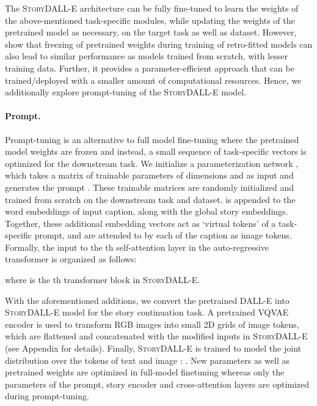\documentclass[runningheads]{llncs}
\newcommand{\sdalle}[1]{\textsc{StoryDALL-E}}
\begin{document}
The \sdalle{} architecture can be fully fine-tuned to learn the weights of the above-mentioned task-specific modules, while updating the weights of the pretrained model as necessary, on the target task as well as dataset. However, \cite{borgeaud2022improving} show that freezing of pretrained weights during training of retro-fitted models can also lead to similar performance as models trained from scratch, with lesser training data. Further, it provides a parameter-efficient approach that can be trained/deployed with a smaller amount of computational resources. Hence, we additionally explore prompt-tuning \cite{li2021prefix} of the \sdalle{} model.


\paragraph{Prompt.} Prompt-tuning is an alternative \cite{li2021prefix} to full model fine-tuning where the pretrained model weights are frozen and instead, a small sequence of task-specific vectors is optimized for the downstream task. We initialize a parameterization network , which takes a matrix of trainable parameters  of dimensions  and  as input and generates the prompt . These trainable matrices are randomly initialized and trained from scratch on the downstream task and dataset.  is appended to the word embeddings of input caption, along with the global story embeddings. Together, these additional embedding vectors act as `virtual tokens' of a task-specific prompt, and are attended to by each of the caption as image tokens. Formally, the input  to the th self-attention layer in the auto-regressive transformer is organized as follows:

where  is the th transformer block in \sdalle{}.


With the aforementioned additions, we convert the pretrained DALL-E into \sdalle{} model for the story continuation task. A pretrained VQVAE encoder \cite{van2016conditional} is used to transform RGB images into small 2D grids of image tokens, which are flattened and concatenated with the modified inputs in \sdalle{} (see Appendix for details). Finally, \sdalle{} is trained to model the joint distribution over the tokens of text  and image : . New parameters as well as pretrained weights are optimized in full-model finetuning whereas only the parameters of the prompt, story encoder and cross-attention layers are optimized during prompt-tuning.
\end{document}
